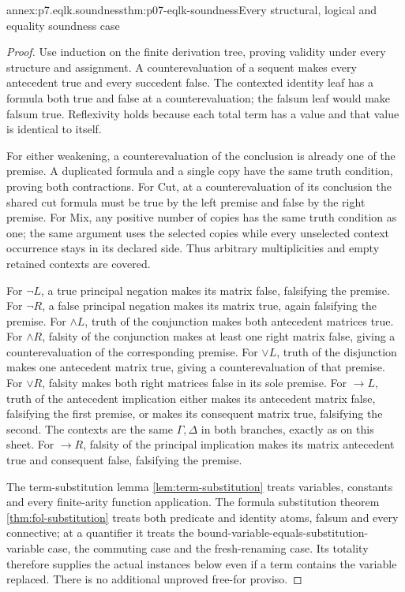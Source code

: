 \begin{annexitem}{annex:p7.eqlk.soundness}{thm:p07-eqlk-soundness}{Every structural, logical and equality soundness case}
\begin{proof}
Use induction on the finite derivation tree, proving validity under every
structure and assignment. A counterevaluation of a sequent makes every
antecedent true and every succedent false. The contexted identity leaf
has a formula both true and false at a counterevaluation; the falsum
leaf would make falsum true. Reflexivity holds because each total term
has a value and that value is identical to itself.

For either weakening, a counterevaluation of the conclusion is already
one of the premise. A duplicated formula and a single copy have the
same truth condition, proving both contractions. For Cut, at a
counterevaluation of its conclusion the shared cut formula must be true
by the left premise and false by the right premise. For Mix, any positive
number of copies has the same truth condition as one; the same argument
uses the selected copies while every unselected context occurrence stays
in its declared side. Thus arbitrary multiplicities and empty retained
contexts are covered.

For \(\neg L\), a true principal negation makes its matrix false,
falsifying the premise. For \(\neg R\), a false principal negation
makes its matrix true, again falsifying the premise. For \(\land L\),
truth of the conjunction makes both antecedent matrices true. For
\(\land R\), falsity of the conjunction makes at least one right
matrix false, giving a counterevaluation of the corresponding premise.
For \(\lor L\), truth of the disjunction makes one antecedent matrix
true, giving a counterevaluation of that premise. For \(\lor R\),
falsity makes both right matrices false in its sole premise.
For \(\to L\), truth of the antecedent implication either makes its
antecedent matrix false, falsifying the first premise, or makes its
consequent matrix true, falsifying the second. The contexts are the
same \(\Gamma,\Delta\) in both branches, exactly as on this sheet.
For \(\to R\), falsity of the principal implication makes its matrix
antecedent true and consequent false, falsifying the premise.

The term-substitution lemma \ref{lem:term-substitution} treats variables,
constants and every finite-arity function application. The formula
substitution theorem \ref{thm:fol-substitution} treats both predicate and
identity atoms, falsum and every connective; at a quantifier it treats
the bound-variable-equals-substitution-variable case, the commuting
case and the fresh-renaming case. Its totality therefore supplies the
actual instances below even if a term contains the variable replaced.
There is no additional unproved free-for proviso.


\end{proof}
\end{annexitem}
